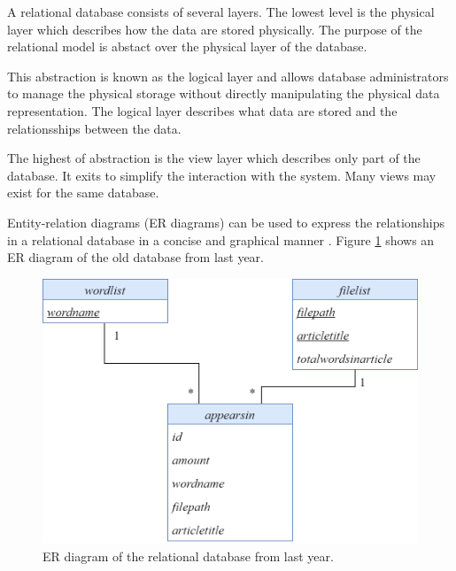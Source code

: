 A relational database consists of several layers.
The lowest level is the physical layer which describes how the data are stored physically.
The purpose of the relational model is abstact over the physical layer of the database.

This abstraction is known as the logical layer and allows database administrators to manage the physical storage without directly manipulating the physical data representation.
The logical layer describes what data are stored and the relationsships between the data.

The highest of abstraction is the view layer which describes only part of the database. It exits to simplify the interaction with the system. Many views may exist for the same database.

Entity-relation diagrams (ER diagrams) can be used to express the relationships in a relational database in a concise and graphical manner \cite{DBSBook} \cite{OracleRDBMS}.
Figure \ref{olddatabase} shows an ER diagram of the old database from last year.

\begin{figure}[h]
    \centering
    \includegraphics[width=\linewidth]{Images/old wordcount db.PNG}
    \caption{ER diagram of the relational database from last year.}
    \label{olddatabase}
\end{figure}